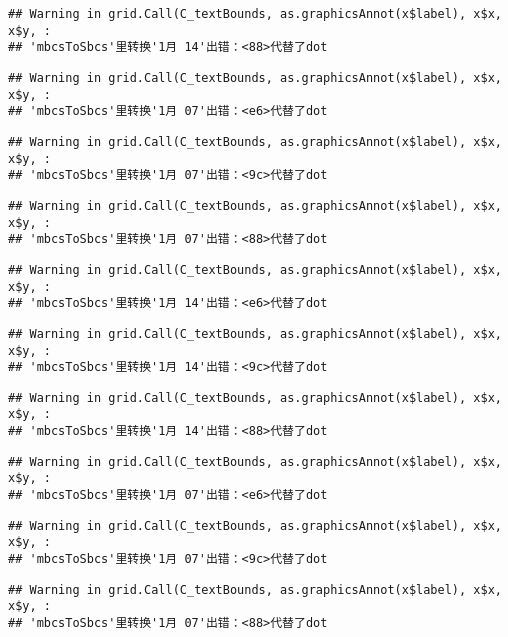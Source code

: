 \documentclass[
]{article}
\begin{document}
\begin{verbatim}
## Warning in grid.Call(C_textBounds, as.graphicsAnnot(x$label), x$x, x$y, :
## 'mbcsToSbcs'里转换'1月 14'出错：<88>代替了dot
\end{verbatim}

\begin{verbatim}
## Warning in grid.Call(C_textBounds, as.graphicsAnnot(x$label), x$x, x$y, :
## 'mbcsToSbcs'里转换'1月 07'出错：<e6>代替了dot
\end{verbatim}

\begin{verbatim}
## Warning in grid.Call(C_textBounds, as.graphicsAnnot(x$label), x$x, x$y, :
## 'mbcsToSbcs'里转换'1月 07'出错：<9c>代替了dot
\end{verbatim}

\begin{verbatim}
## Warning in grid.Call(C_textBounds, as.graphicsAnnot(x$label), x$x, x$y, :
## 'mbcsToSbcs'里转换'1月 07'出错：<88>代替了dot
\end{verbatim}

\begin{verbatim}
## Warning in grid.Call(C_textBounds, as.graphicsAnnot(x$label), x$x, x$y, :
## 'mbcsToSbcs'里转换'1月 14'出错：<e6>代替了dot
\end{verbatim}

\begin{verbatim}
## Warning in grid.Call(C_textBounds, as.graphicsAnnot(x$label), x$x, x$y, :
## 'mbcsToSbcs'里转换'1月 14'出错：<9c>代替了dot
\end{verbatim}

\begin{verbatim}
## Warning in grid.Call(C_textBounds, as.graphicsAnnot(x$label), x$x, x$y, :
## 'mbcsToSbcs'里转换'1月 14'出错：<88>代替了dot
\end{verbatim}

\begin{verbatim}
## Warning in grid.Call(C_textBounds, as.graphicsAnnot(x$label), x$x, x$y, :
## 'mbcsToSbcs'里转换'1月 07'出错：<e6>代替了dot
\end{verbatim}

\begin{verbatim}
## Warning in grid.Call(C_textBounds, as.graphicsAnnot(x$label), x$x, x$y, :
## 'mbcsToSbcs'里转换'1月 07'出错：<9c>代替了dot
\end{verbatim}

\begin{verbatim}
## Warning in grid.Call(C_textBounds, as.graphicsAnnot(x$label), x$x, x$y, :
## 'mbcsToSbcs'里转换'1月 07'出错：<88>代替了dot
\end{verbatim}
\end{document}
